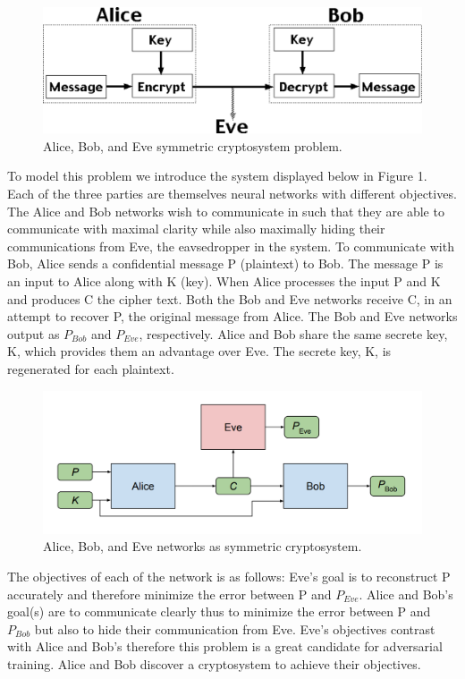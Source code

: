 \documentclass[12pt]{article}
\begin{document}
\begin{figure}[h]
\includegraphics[width=16cm]{../assets/AliceBobEveSymmetricCryptosystemProblem.png}
\caption{Alice, Bob, and Eve symmetric cryptosystem problem.}
\centering
\end{figure}
To model this problem we introduce the system displayed below in Figure 1. Each of the three parties are themselves neural networks with different objectives. The Alice and Bob networks wish to communicate in such that they are able to communicate with maximal clarity while also maximally hiding their communications from Eve, the eavsedropper in the system. To communicate with Bob, Alice sends a confidential message P (plaintext) to Bob. The message P is an input to Alice along with K (key). When Alice processes the input P and K and produces C the cipher text. Both the Bob and Eve networks receive C, in an attempt to recover P, the original message from Alice. The Bob and Eve networks output as $P_{Bob}$ and $P_{Eve}$, respectively. Alice and Bob share the same secrete key, K, which provides them an advantage over Eve. The secrete key, K, is regenerated for each plaintext.

\begin{figure}[h]
\includegraphics[width=16cm]{../assets/OverviewOfCryptosystem.png}
\caption{Alice, Bob, and Eve networks as symmetric cryptosystem.}
\centering
\end{figure}

The objectives of each of the network is as follows: Eve’s goal is to reconstruct P accurately and therefore minimize the error between P and $P_{Eve}$.  Alice and Bob's goal(s) are to communicate clearly thus to minimize the error between P and $P_{Bob}$ but also to hide their communication from Eve. Eve’s objectives contrast with Alice and Bob’s therefore this problem is a great candidate for adversarial training. Alice and Bob discover a cryptosystem to achieve their objectives.
\end{document}
